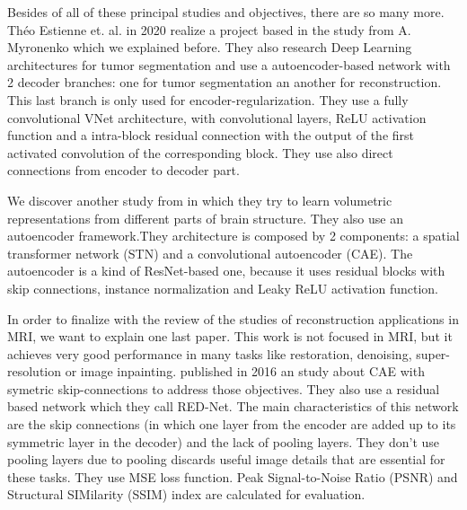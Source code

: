 

Besides of all of these principal studies and objectives, there are so many more. Théo Estienne et. al. \cite{otherBraTS2020} in 2020 realize a project based in the study from A. Myronenko \cite{myronenko20183d} which we explained before. They also research Deep Learning architectures for tumor segmentation and use a autoencoder-based network with 2 decoder branches: one for tumor segmentation an another for reconstruction. This last branch is only used for encoder-regularization. They use a fully convolutional VNet architecture, with convolutional layers, ReLU activation function and a intra-block residual
connection with the output of the first activated convolution of the corresponding block. They use also direct connections from encoder to decoder part. 

We discover another study from  in which they try to learn volumetric representations from different parts of brain structure. They also use an autoencoder framework.They architecture is composed by 2 components: a spatial transformer network (STN) and a convolutional autoencoder (CAE). The autoencoder is a kind of ResNet-based one, because it uses residual blocks with skip connections, instance normalization and Leaky ReLU activation function.

In order to finalize with the review of the studies of reconstruction applications in MRI, we want to explain one last paper. This work is not focused in MRI, but it achieves very good performance in many tasks like restoration, denoising, super-resolution or image inpainting.  published in 2016 an study about CAE with symetric skip-connections to address those objectives. They also use a residual based network which they call RED-Net. The main characteristics of this network are the skip connections (in which one layer from the encoder are added up to its symmetric layer in the decoder) and the lack of pooling layers. They don't use pooling layers due to pooling discards useful image details that are essential for these tasks. They use MSE loss function. Peak Signal-to-Noise Ratio
(PSNR) and Structural SIMilarity (SSIM) index are calculated for evaluation.


